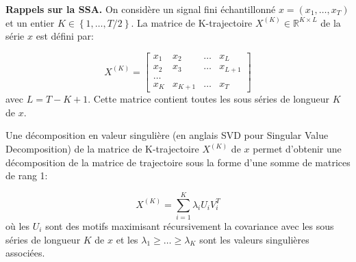 \documentclass{gretsi}
\def\HH{\mathcal H}
\newcommand{\R}{\mathbb R}
\newcommand{\val}[3]{(#1_1 #3 \dots #3 #1_#2)}
\begin{document}
\noindent\textbf{Rappels sur la SSA.}\label{sub:rap}
On considère un signal fini échantillonné $x = \val{x}{T}{,}$ et un entier $K \in \left \{ 1, \dots, T/2 \right \}$.
La matrice de K-trajectoire $X^{(K)} \in \R^{K\times L}$ de la série $x$ est défini par:
\begin{sloppypar}
\begin{equation} 
    X^{(K)} =
    \begin{bmatrix}
	    x_1 & x_2 &\dots & x_L\\
	    x_2 & x_3 &\dots & x_{L+1}\\
	    \dots\\
	    x_{K} & x_{K+1} &\dots & x_T
    \end{bmatrix}
\end{equation}
avec $L = T-K+1$.
Cette matrice contient toutes les sous séries de longueur $K$ de $x$.

Une décomposition en valeur singulière (en anglais SVD pour Singular Value Decomposition) de la matrice de K-trajectoire $X^{(K)}$ de $x$ permet d'obtenir une décomposition de la matrice de trajectoire sous la forme d'une somme de matrices de rang 1:
\end{sloppypar}
\vspace{-.55cm}
\begin{equation}
	X^{(K)} = \sum_{i=1}^K \lambda_i U_iV_i^T
\end{equation} 
où les $U_i$ sont des motifs maximisant récursivement la covariance avec les sous séries de longueur $K$ de $x$ et les $\lambda_1\ge \dots\ge \lambda_K$ sont les valeurs singulières associées.
\end{document}
